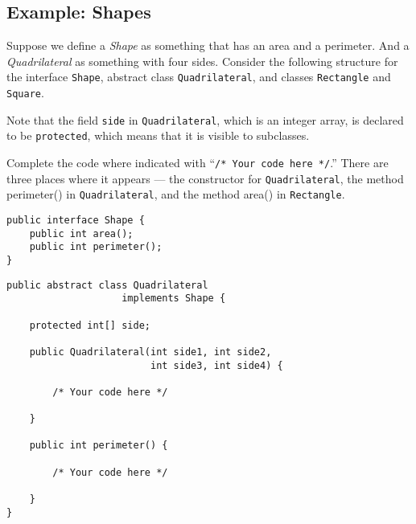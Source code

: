 \newpage
\subsection*{Example: Shapes}
Suppose we define a \textit{Shape} as something that has
an area and a perimeter. And a \textit{Quadrilateral} as something
with four sides. Consider the following structure for the interface
\texttt{Shape}, abstract class \texttt{Quadrilateral}, and
classes \texttt{Rectangle} and \texttt{Square}.

Note that the field \texttt{side} in \texttt{Quadrilateral}, 
which is an integer array, is declared to be \texttt{protected},
which means that it is visible to subclasses.

Complete the
code where indicated with ``\verb+/* Your code here */+.'' There
are three places where it appears --- the constructor for
\texttt{Quadrilateral}, the method \textsf{perimeter()} in 
\texttt{Quadrilateral}, and the method \textsf{area()} in 
\texttt{Rectangle}.

\begin{minipage}[t]{0.4\linewidth}
\begin{verbatim}
public interface Shape {
    public int area();
    public int perimeter();
}
\end{verbatim}
\end{minipage}
\begin{minipage}[t]{0.45\linewidth}
\begin{verbatim}
public abstract class Quadrilateral 
                    implements Shape {

    protected int[] side;

    public Quadrilateral(int side1, int side2,
                         int side3, int side4) {

        /* Your code here */

    }

    public int perimeter() {

        /* Your code here */

    }
}
\end{verbatim}
\end{minipage}

